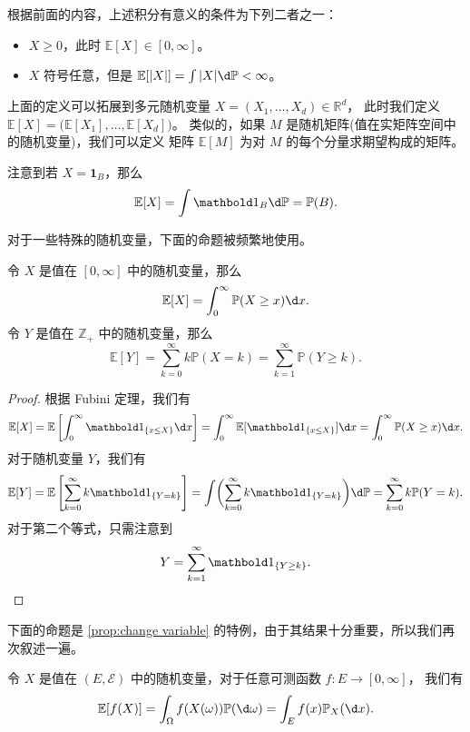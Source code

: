 \documentclass[fontset=none]{Notes}
\begin{document}
根据前面的内容，上述积分有意义的条件为下列二者之一：
\begin{itemize}[nosep]
  \item $X\geq 0$，此时 $\mathbb{E}[X]\in [0,\infty]$。
  \item $X$ 符号任意，但是 $\mathbb{E}[|X|]=\int|X| \d \mathbb{P}<\infty$。
\end{itemize}


上面的定义可以拓展到多元随机变量 $X=(X_1,\dots,X_d)\in \mathbb{R}^d$，
此时我们定义 $\mathbb{E}[X]=\bigl(\mathbb{E}[X_1],\dots,\mathbb{E}[X_d]\bigr)$。
类似的，如果 $M$ 是随机矩阵(值在实矩阵空间中的随机变量)，我们可以定义
矩阵 $\mathbb{E}[M]$ 为对 $M$ 的每个分量求期望构成的矩阵。

注意到若 $X=\mathbold 1_B$，那么
\[
  \mathbb{E}[X]=\int\mathbold 1_B \d \mathbb{P}=\mathbb{P}(B).
\]

对于一些特殊的随机变量，下面的命题被频繁地使用。

\begin{proposition}
  令 $X$ 是值在 $[0,\infty]$ 中的随机变量，那么
  \[
    \mathbb{E}[X]=\int_0^\infty \mathbb{P}(X\geq x) \d x.
  \]
  令 $Y$ 是值在 $\mathbb{Z}_+$ 中的随机变量，那么
  \[
    \mathbb{E}[Y]=\sum_{k=0}^\infty k \mathbb{P}(X=k)=\sum_{k=1}^\infty \mathbb{P}(Y\geq k).
  \]
\end{proposition}
\begin{proof}
  根据 Fubini 定理，我们有
  \[
    \mathbb{E}[X]=\mathbb{E}\left[
      \int_0^\infty \mathbold 1_{\{x\leq X\}}\d x
    \right]=\int_0^\infty \mathbb{E}[\mathbold 1_{\{x\leq X\}}] \d x
    =\int_0^\infty \mathbb{P}(X\geq x) \d x.
  \]
  对于随机变量 $Y$，我们有
  \[
    \mathbb{E}[Y]=\mathbb{E}\left[
      \sum_{k=0}^\infty k\mathbold 1_{\{Y=k\}}
    \right]=\int \biggl(\sum_{k=0}^\infty k\mathbold 1_{\{Y=k\}}\biggr)\d \mathbb{P}
    =\sum_{k=0}^\infty k \mathbb{P}(Y=k).
  \]
  对于第二个等式，只需注意到
  \[
    Y=\sum_{k=1}^\infty \mathbold 1_{\{Y\geq k\}}.\qedhere
  \]
\end{proof}

下面的命题是 \autoref{prop:change variable} 的特例，由于其结果十分重要，所以我们再次叙述一遍。

\begin{proposition}\label{prop:use law to calculate exception}
  令 $X$ 是值在 $(E,\mathcal{E})$ 中的随机变量，对于任意可测函数 $f:E\to [0,\infty]$，
  我们有
  \[
    \mathbb{E}[f(X)]=\int_\Omega f(X(\omega)) \mathbb{P}(\d\omega)=\int_E f(x) \mathbb{P}_X(\d x).
  \]
\end{proposition}
\end{document}
